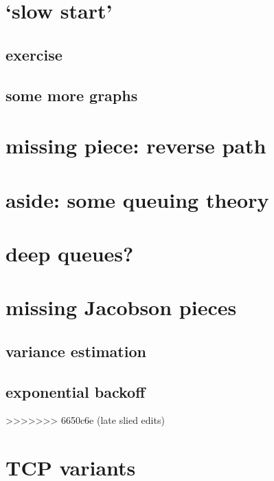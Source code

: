 \section{`slow start'}


\subsection{exercise}


\subsection{some more graphs}


\section{missing piece: reverse path}


\section{aside: some queuing theory}


\section{deep queues?}


\section{missing Jacobson pieces}

\subsection{variance estimation}


\subsection{exponential backoff}

>>>>>>> 6650c6e (late slied edits)

\section{TCP variants}


